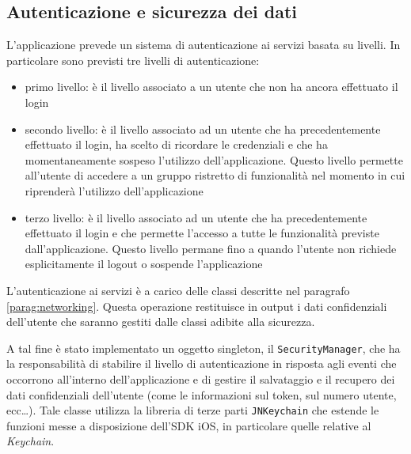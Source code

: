 \subsection{Autenticazione e sicurezza dei dati}
L'applicazione prevede un sistema di autenticazione ai servizi basata su livelli. In particolare sono previsti tre livelli di autenticazione:
\begin{itemize}
 \item primo livello: è il livello associato a un utente che non ha ancora effettuato il login
 \item secondo livello: è il livello associato ad un utente che ha precedentemente effettuato il login, ha scelto di ricordare le credenziali e che ha momentaneamente sospeso l'utilizzo dell'applicazione. Questo livello permette all'utente di accedere a un gruppo ristretto di funzionalità nel momento in cui riprenderà l'utilizzo dell'applicazione
 \item terzo livello: è il livello associato ad un utente che ha precedentemente effettuato il login e che permette l'accesso a tutte le funzionalità previste dall'applicazione. Questo livello permane fino a quando l'utente non richiede esplicitamente il logout o sospende l'applicazione
\end{itemize}

L'autenticazione ai servizi è a carico delle classi descritte nel paragrafo \ref{parag:networking}. Questa operazione restituisce in output i dati confidenziali dell'utente che saranno gestiti dalle classi adibite alla sicurezza.

A tal fine è stato implementato un oggetto singleton, il \texttt{SecurityManager}, che ha la responsabilità di stabilire il livello di autenticazione in risposta agli eventi che occorrono all'interno dell'applicazione e di gestire il salvataggio e il recupero dei dati confidenziali dell'utente (come le informazioni sul token, sul numero utente, ecc\dots). Tale classe utilizza la libreria di terze parti \texttt{JNKeychain} che estende le funzioni messe a disposizione dell'SDK iOS, in particolare quelle relative al \emph{Keychain}. 


